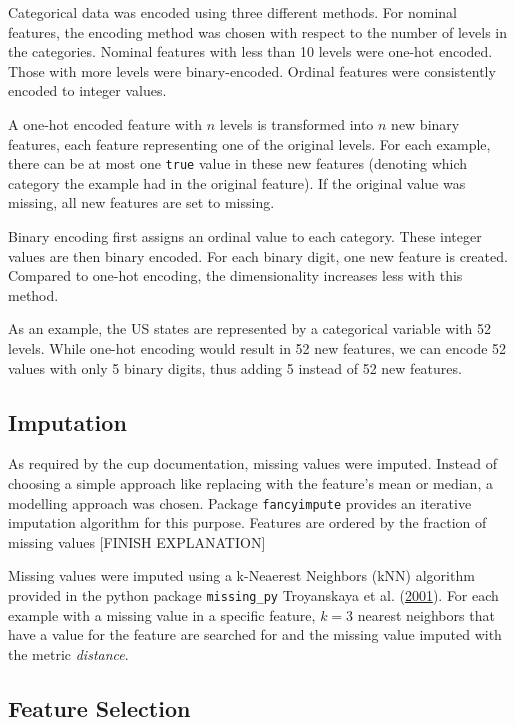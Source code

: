 \documentclass[
  11pt,
  a4paper,
  DIV=12,captions=tableheading,oneside]{scrbook}
\begin{document}
Categorical data was encoded using three different methods. For nominal features, the encoding method was chosen with respect to the number of levels in the categories. Nominal features with less than 10 levels were one-hot encoded. Those with more levels were binary-encoded. Ordinal features were consistently encoded to integer values.

A one-hot encoded feature with \(n\) levels is transformed into \(n\) new binary features, each feature representing one of the original levels. For each example, there can be at most one \texttt{true} value in these new features (denoting which category the example had in the original feature). If the original value was missing, all new features are set to missing.

Binary encoding first assigns an ordinal value to each category. These integer values are then binary encoded. For each binary digit, one new feature is created. Compared to one-hot encoding, the dimensionality increases less with this method.

As an example, the US states are represented by a categorical variable with 52 levels. While one-hot encoding would result in 52 new features, we can encode 52 values with only 5 binary digits, thus adding 5 instead of 52 new features.

\hypertarget{imputation}{%
\subsection{Imputation}\label{imputation}}

As required by the cup documentation, missing values were imputed. Instead of choosing a simple approach like replacing with the feature's mean or median, a modelling approach was chosen. Package \texttt{fancyimpute} provides an iterative imputation algorithm for this purpose. Features are ordered by the fraction of missing values {[}FINISH EXPLANATION{]}

Missing values were imputed using a k-Neaerest Neighbors (kNN) algorithm provided in the python package \texttt{missing\_py} Troyanskaya et al. (\protect\hyperlink{ref-troyanskaya2001missing}{2001}). For each example with a missing value in a specific feature, \(k=3\) nearest neighbors that have a value for the feature are searched for and the missing value imputed with the metric \emph{distance}.

\hypertarget{feature-selection}{%
\subsection{Feature Selection}\label{feature-selection}}
\end{document}
